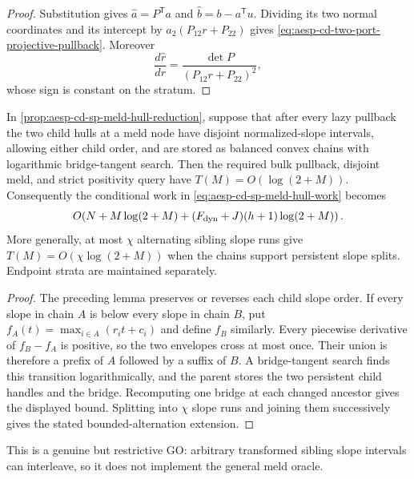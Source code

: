 \begin{proof}
Substitution gives
$\widehat a=P^{\mathsf T}a$ and
$\widehat b=b-a^{\mathsf T}u$.  Dividing its two normal coordinates and its
intercept by $a_2(P_{12}r+P_{22})$ gives
\cref{eq:aesp-cd-two-port-projective-pullback}.  Moreover
\begin{equation*}
 \frac{d\widehat r}{dr}
 =\frac{\det P}{(P_{12}r+P_{22})^2},
\end{equation*}
whose sign is constant on the stratum.
\end{proof}

\begin{corollary}
\label{cor:aesp-cd-slope-separated-projective-meld}
In \cref{prop:aesp-cd-sp-meld-hull-reduction}, suppose that after every lazy
pullback the two child hulls at a meld node have disjoint normalized-slope
intervals, allowing either child order, and are stored as balanced convex
chains with logarithmic bridge-tangent search.  Then the required bulk
pullback, disjoint meld, and strict positivity query have
$T(M)=O(\log(2+M))$.  Consequently the conditional work in
\cref{eq:aesp-cd-sp-meld-hull-work} becomes
\begin{equation*}
 O\!\left(N+M\log(2+M)
 +(F_{\rm dyn}+J)(h+1)\log(2+M)\right).
\end{equation*}
More generally, at most $\chi$ alternating sibling slope runs give
$T(M)=O(\chi\log(2+M))$ when the chains support persistent slope splits.
Endpoint strata are maintained separately.
\end{corollary}

\begin{proof}
The preceding lemma preserves or reverses each child slope order.  If every
slope in chain $A$ is below every slope in chain $B$, put
$f_A(t)=\max_{i\in A}(r_it+c_i)$ and define $f_B$ similarly.  Every
piecewise derivative of $f_B-f_A$ is positive, so the two envelopes cross at
most once.  Their union is therefore a prefix of $A$ followed by a suffix of
$B$.  A bridge-tangent search finds this transition logarithmically, and the
parent stores the two persistent child handles and the bridge.  Recomputing
one bridge at each changed ancestor gives the displayed bound.
Splitting into $\chi$ slope runs and joining them successively gives the
stated bounded-alternation extension.
\end{proof}

This is a genuine but restrictive GO: arbitrary transformed sibling slope
intervals can interleave, so it does not implement the general meld oracle.

